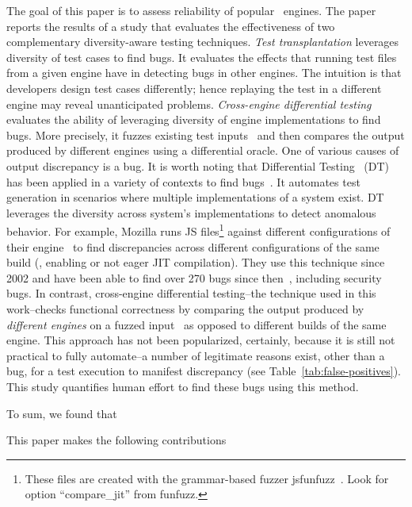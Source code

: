 \documentclass[10pt,conference,anonymous]{IEEEtran}
\begin{document}
The goal of this paper is to assess reliability of popular
\js\ engines. The paper reports the results of a study that evaluates
the effectiveness of two complementary diversity-aware testing techniques. \emph{Test transplantation} leverages
diversity of test cases to find bugs. It evaluates the effects that
running \js{} test files from a given engine have in detecting bugs in
other engines. The intuition is that developers design test cases
differently; hence replaying the test in a different engine may reveal
unanticipated problems. \emph{Cross-engine differential testing}
evaluates the ability of leveraging diversity of engine
implementations to find bugs. More precisely, it fuzzes existing test
inputs~\cite{fuzz-testing-history} and then compares the output
produced by different engines using a differential oracle. One of
various causes of output discrepancy is a bug. It is worth noting that
Differential Testing~\cite{Brumley-etal-ss07} (DT) has been applied in
a variety of contexts to find
bugs~\cite{Yang-etal-pldi11,Chen-etal-fse2015,Argyros-etla-ccs16,Chen-etal-pldi16,petsios-etal-sp2017,SivakornAPKJ17,Zhang:2017:ATD:3097368.3097448}. It
automates test generation in scenarios where multiple implementations
of a system exist. DT leverages the diversity across system's
implementations to detect anomalous behavior. For example, Mozilla
runs JS files\footnote{These files are created with the grammar-based fuzzer
  jsfunfuzz~\cite{jsfunfuzz}. Look for option ``compare\_jit'' from funfuzz.} against different configurations of their
\smonkey{} engine~\cite{jsfunfuzz-mozilla-bug} to find discrepancies
across different configurations of the same build (\eg{}, enabling or
not eager JIT compilation). They use this technique since 2002 and
have been able to find over 270 bugs since
then~\cite{jsfunfuzz-at-mozilla}, including security bugs.  In
contrast, cross-engine differential testing--the technique used in
this work--checks functional correctness by comparing the output
produced by \emph{different engines} on a fuzzed
input~\cite{patra2016learning} as opposed to different builds of the
same engine. This approach has not been
popularized, certainly, because it is still not practical to fully automate--a
number of legitimate reasons exist, other than a bug, for a test
execution to manifest discrepancy (see
Table~\ref{tab:false-positives}). This study quantifies human effort
to find these bugs using this method.

To sum, we found that 

This paper makes the following contributions 
\end{document}
